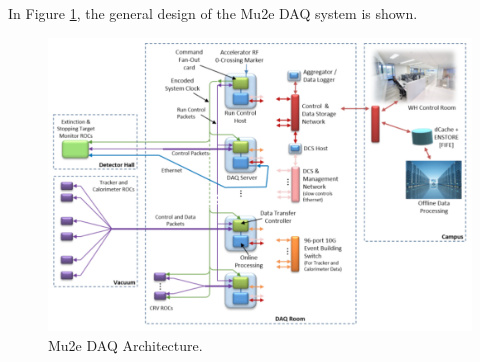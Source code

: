 In Figure \ref{fig:linktodaq}, the general design of the Mu2e DAQ system is shown.
\begin{figure}[!h]
\centering
\includegraphics[width =\textwidth]{figures/png/Screenshot_20240206_144803.png}
\caption{Mu2e DAQ Architecture.}
\label{fig:linktodaq}
\end{figure}
